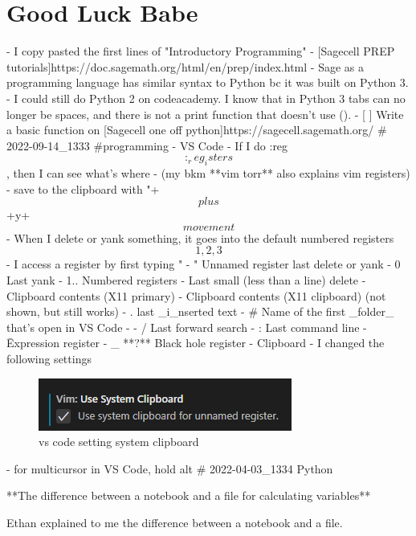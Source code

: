 \section{Good Luck Babe}
- I copy pasted the first lines of "Introductory Programming"
    - [Sagecell PREP tutorials]{https://doc.sagemath.org/html/en/prep/index.html}
- Sage as a programming language has similar syntax to Python bc it was built on Python 3.
- I could still do Python 2 on codeacademy. I know that in Python 3 tabs can no longer be spaces, and there is not a print function that doesn't use ().
- [ ] Write a basic function on [Sagecell one off python]{https://sagecell.sagemath.org/}
# 2022-09-14_1333
#programming
- VS Code
  - If I do :reg \[:_reg_isters\], then I can see what's where
    - (my bkm **vim torr** also explains vim registers)
    - save to the clipboard with "+\[plus \]+y+\[movement \]
    - When I delete or yank something, it goes into the default numbered registers \[1,2,3\]
    - I access a register by first typing "
      - " Unnamed register last delete or yank
      - 0 Last yank
      - 1.. Numbered registers
      - \- Last small (less than a line) delete
      - \* Clipboard contents (X11 primary)
      - \+ Clipboard contents (X11 clipboard) (not shown, but still works)
      - . last _i_nserted text
      - \# Name of the first _folder_ that's open in VS Code
      - %
      - / Last forward search
      - : Last command line
      - \= Expression register
      - _ **?** Black hole register
  - Clipboard
        - I changed the following settings
\begin{figure}
    \centering
    \includegraphics[width=0.5\linewidth]{vs code setting system clipboard.png}
    \caption{vs code setting system clipboard}
\end{figure}
       - for multicursor in VS Code, hold alt
# 2022-04-03_1334 Python

**The difference between a notebook and a file for calculating variables**

Ethan explained to me the difference between a notebook and a file.

